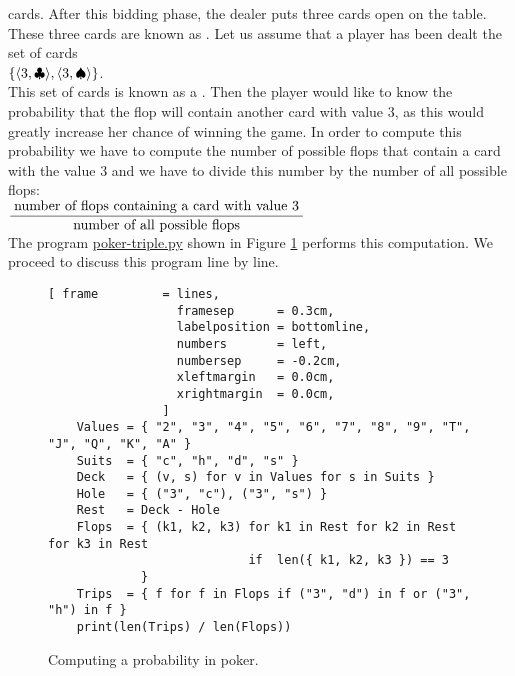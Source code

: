 cards.   After this bidding phase, the dealer puts three cards open on the table.  These three cards are
known as .  Let us assume that a player has been dealt the set of cards
\\[0.2cm]
\hspace*{1.3cm}
$\{ \pair(3, \club), \pair(3, \spade) \}$.
\\[0.2cm]
This set of cards is known as a .  Then the player would like to know the probability
that the flop will contain another card with value $3$, as this would greatly increase her chance of
winning the game.  In order to compute this probability we have to compute the number of possible
flops that contain a card with the value $3$ and we have to divide this number by the number of all
possible flops:
\\[0.2cm]
\hspace*{1.3cm}
$\displaystyle \frac{\;\mbox{number of flops containing a card with value $3$}\;}{\mbox{number of all possible flops}}$
\\[0.2cm]
The program
\href{https://github.com/karlstroetmann/Logic/blob/master/Python/poker-triple.py}{poker-triple.py}
shown in Figure \ref{fig:poker-triple.py} performs this computation.  We proceed to discuss this
program line by line.


\begin{figure}[!ht]
\centering
\begin{Verbatim}[ frame         = lines, 
                  framesep      = 0.3cm, 
                  labelposition = bottomline,
                  numbers       = left,
                  numbersep     = -0.2cm,
                  xleftmargin   = 0.0cm,
                  xrightmargin  = 0.0cm,
                ]
    Values = { "2", "3", "4", "5", "6", "7", "8", "9", "T", "J", "Q", "K", "A" } 
    Suits  = { "c", "h", "d", "s" }
    Deck   = { (v, s) for v in Values for s in Suits }
    Hole   = { ("3", "c"), ("3", "s") }
    Rest   = Deck - Hole
    Flops  = { (k1, k2, k3) for k1 in Rest for k2 in Rest for k3 in Rest 
                            if  len({ k1, k2, k3 }) == 3 
             }
    Trips  = { f for f in Flops if ("3", "d") in f or ("3", "h") in f }
    print(len(Trips) / len(Flops))
\end{Verbatim}
\vspace*{-0.3cm}
\caption{Computing a probability in poker.}
\label{fig:poker-triple.py}
\end{figure}

